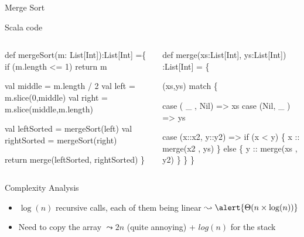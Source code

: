 \begin{frame}[fragile]{Merge Sort}
  \begin{block}{Scala code}\smallskip
    \begin{columns}
      \begin{column}{.45\linewidth}
        \begin{boitecode}{}
def mergeSort(m: List[Int]):List[Int] =\{
  if (m.length <= 1) 
    return m

  val middle = m.length / 2
  val left  = m.slice(0,middle)
  val right = m.slice(middle,m.length)
  
  val leftSorted  = mergeSort(left)
  val rightSorted = mergeSort(right)

  return merge(leftSorted, rightSorted)
\}          
        \end{boitecode}
      \end{column}
      \begin{column}{.4\linewidth}
        \begin{boitecode}{}
def merge(xs:List[Int], ys:List[Int]) 
    :List[Int] = \{

  (xs,ys) match \{

    case ( _ , Nil) => xs
    case (Nil,  _ ) => ys

    case (x::x2, y::y2) =>
       if (x < y) \{
          x :: merge(x2 , ys)
       \} else \{
          y :: merge(xs , y2)
       \}
  \}
\}
        \end{boitecode}
      \end{column}
    \end{columns}
  \end{block}
  \begin{block}{Complexity Analysis}
    \begin{itemize}
    \item {} $\log(n)$ recursive calls, each of them being
      linear $\leadsto \alert{\Theta(n\times \log(n))}$
    \item {} Need to copy the array $\leadsto 2n$ (quite
      annoying) + $log(n)$ for the stack
    \end{itemize}
  \end{block}
\end{frame}
